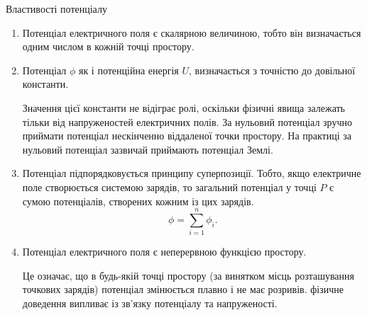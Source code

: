 \documentclass{beamer}
\begin{document}
\begin{frame}{Властивості потенціалу}
	\begin{enumerate}\justifying
		\item Потенціал електричного поля є \alert{скалярною величиною},
		      тобто він визначається одним числом в кожній точці простору.
		\item Потенціал $\phi$ як і потенційна енергія $U$, визначається
		      \alert{з точністю до довільної константи}.

		      \begin{alertblock}{}\justifying\small
			      Значення цієї константи не відіграє ролі, оскільки фізичні явища залежать
			      тільки від напруженостей електричних полів. За нульовий потенціал зручно
			      приймати потенціал нескінченно віддаленої точки простору. На практиці за
			      нульовий потенціал зазвичай приймають потенціал Землі.
		      \end{alertblock}

		\item Потенціал підпорядковується принципу суперпозиції. Тобто, якщо
		      електричне поле створюється системою зарядів, то загальний
		      потенціал у точці $P$ є \alert{сумою
			      потенціалів}, створених кожним із цих зарядів.
		      \begin{equation*}
			      \phi = \sum_{i = 1}^{n} \phi_i.
		      \end{equation*}

		\item Потенціал електричного поля є \alert{неперервною функцією
			      простору}.

		      \begin{block}{}\justifying\small
			      Це означає, що в будь-якій точці простору (за
			      винятком  місць розташування точкових зарядів) потенціал
			      змінюється плавно і
			      не має розривів. \alert{фізичне доведення випливає із зв'язку
				      потенціалу та напруженості}.
		      \end{block}
	\end{enumerate}
\end{frame}
\end{document}
